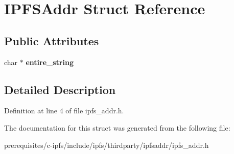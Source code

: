 \hypertarget{struct_i_p_f_s_addr}{}\section{I\+P\+F\+S\+Addr Struct Reference}
\label{struct_i_p_f_s_addr}
\subsection*{Public Attributes}
\begin{DoxyCompactItemize}
\item 
\mbox{\label{struct_i_p_f_s_addr_a953fdc7176ae81a0ce1944e22894c5a1}} 
char $\ast$ {\bfseries entire\+\_\+string}
\end{DoxyCompactItemize}


\subsection{Detailed Description}


Definition at line 4 of file ipfs\+\_\+addr.\+h.



The documentation for this struct was generated from the following file\+:\begin{DoxyCompactItemize}
\item 
prerequisites/c-\/ipfs/include/ipfs/thirdparty/ipfsaddr/ipfs\+\_\+addr.\+h\end{DoxyCompactItemize}
